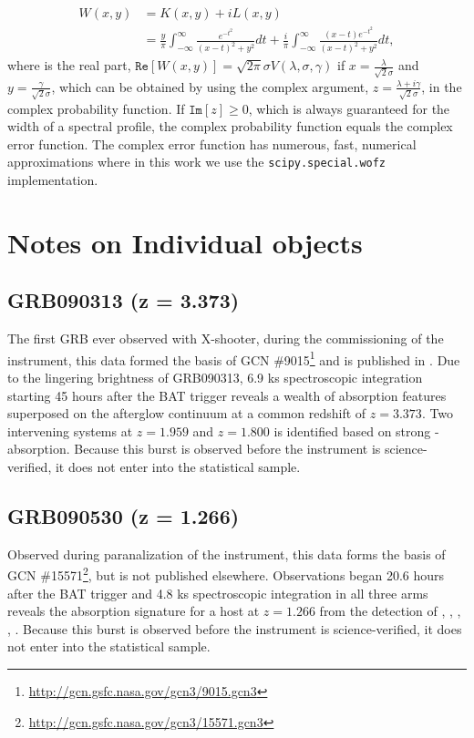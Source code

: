 \documentclass{aa}    %
\begin{document}
\begin{equation} 
\begin{split}
W(x, y)  
& = K(x, y) + i L(x, y) \\
& = \frac{y}{\pi}  \int_{-\infty}^{\infty} \frac{e^{- t^2 }}{(x -  t)^2 +y^2} dt  + \frac{i}{\pi}  \int_{-\infty}^{\infty} \frac{(x - t)e^{- t^2 }}{(x -  t)^2 +y^2} dt,
\end{split}
\end{equation}
where is the real part, $\mathtt{Re}[W(x, y)] =  \sqrt{2 \pi} \sigma V(\lambda,\sigma, \gamma)$ if $x = \frac{\lambda}{\sqrt{2} \sigma}$ and $y = \frac{\gamma}{\sqrt{2} \sigma}$, which can be obtained by using the complex argument, $z = \frac{\lambda + i\gamma}{\sqrt{2} \sigma}$, in the complex probability function. If $\mathtt{Im}[z] \geq 0$, which is always guaranteed for the width of a spectral profile, the complex probability function equals the complex error function. The complex error function has numerous, fast, numerical approximations where in this work we use the \texttt{scipy.special.wofz} \citep{scipy} implementation.


\section{Notes on Individual objects}

\subsection{GRB090313 (z = 3.373)}
The first GRB ever observed with X-shooter, during the commissioning of the
instrument, this data formed the basis of GCN
\#9015\footnote{\url{http://gcn.gsfc.nasa.gov/gcn3/9015.gcn3}} and is published
in \citet{DeUgartePostigo2010}. Due to the lingering brightness of GRB090313,
6.9 ks spectroscopic integration starting 45 hours after the BAT trigger reveals
a wealth of absorption features superposed on the afterglow continuum at a
common redshift of $z = 3.373$. Two intervening systems at $z = 1.959$ and $z =
1.800$ is identified based on strong \mgii-absorption. Because this burst is
observed before the instrument is science-verified, it does not enter into the
statistical sample.

\subsection{GRB090530 (z = 1.266)}
Observed during paranalization of the instrument, this data forms the basis of
GCN \#15571\footnote{\url{http://gcn.gsfc.nasa.gov/gcn3/15571.gcn3}}, but is not
published elsewhere. Observations began 20.6 hours after the BAT trigger and 4.8
ks spectroscopic integration in all three arms reveals the absorption signature
for a host at $z = 1.266$ from the detection of \mgii, \mgi, \SIii, \feii,
\aliii. Because this burst is observed before the instrument is
science-verified, it does not enter into the statistical sample.
\end{document}
